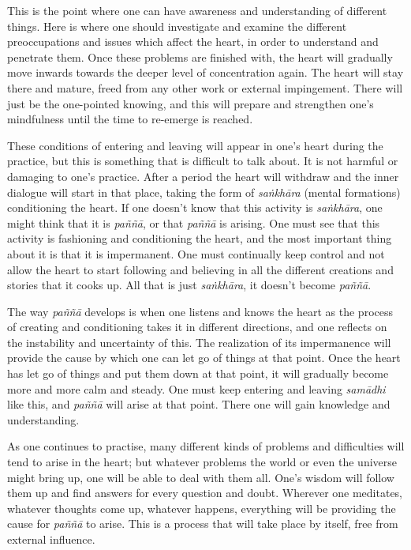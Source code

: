 This is the point where one can have awareness and understanding of
different things. Here is where one should investigate and examine the
different preoccupations and issues which affect the heart, in order to
understand and penetrate them. Once these problems are finished with, 
the heart will gradually move inwards towards the deeper level of
concentration again. The heart will stay there and mature, freed from
any other work or external impingement. There will just be the
one-pointed knowing, and this will prepare and strengthen one's
mindfulness until the time to re-emerge is reached. 

These conditions of entering and leaving will appear in one's heart
during the practice, but this is something that is difficult to talk
about. It is not harmful or damaging to one's practice. After a period
the heart will withdraw and the inner dialogue will start in that place, 
taking the form of \emph{saṅkhāra} (mental formations) conditioning the
heart. If one doesn't know that this activity is \emph{saṅkhāra}, one
might think that it is \emph{paññā}, or that \emph{paññā} is arising. 
One must see that this activity is fashioning and conditioning the
heart, and the most important thing about it is that it is impermanent. 
One must continually keep control and not allow the heart to start
following and believing in all the different creations and stories that
it cooks up. All that is just \emph{saṅkhāra}, it doesn't become
\emph{paññā}. 

The way \emph{paññā} develops is when one listens and knows the heart
as the process of creating and conditioning takes it in different
directions, and one reflects on the instability and uncertainty of this. 
The realization of its impermanence will provide the cause by which one
can let go of things at that point. Once the heart has let go of things
and put them down at that point, it will gradually become more and more
calm and steady. One must keep entering and leaving \emph{samādhi} like
this, and \emph{paññā} will arise at that point. There one will gain
knowledge and understanding. 

As one continues to practise, many different kinds of problems and
difficulties will tend to arise in the heart; but whatever problems the
world or even the universe might bring up, one will be able to deal with
them all. One's wisdom will follow them up and find answers for every
question and doubt. Wherever one meditates, whatever thoughts come up, 
whatever happens, everything will be providing the cause for
\emph{paññā} to arise. This is a process that will take place by itself, 
free from external influence.


